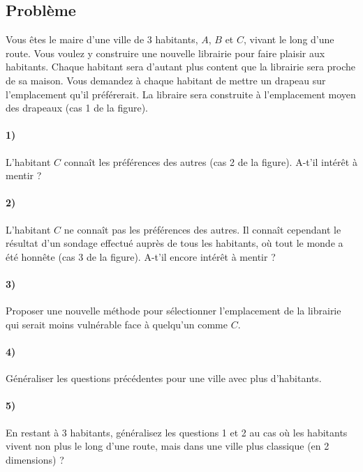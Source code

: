 \documentclass[a4paper,10pt,oneside]{article}
\begin{document}
\subsection{Problème}

Vous êtes le maire d'une ville de 3 habitants, $A$, $B$ et $C$,  vivant le long d'une route.
Vous voulez y construire une nouvelle librairie pour faire plaisir aux habitants.
Chaque habitant sera d'autant plus content que la librairie sera proche de sa maison. 
Vous demandez à chaque habitant de mettre un drapeau sur l'emplacement qu'il préférerait.
La libraire sera construite à l'emplacement moyen des drapeaux (cas 1 de la figure).

\paragraph*{1)} 
L'habitant $C$ connaît les préférences des autres (cas 2 de la figure).
A-t'il intérêt à mentir ?

\paragraph*{2)} 
L'habitant $C$ ne connaît pas les préférences des autres.
Il connaît cependant le résultat d'un sondage effectué auprès de tous les habitants, où tout le monde a été honnête (cas 3 de la figure).
A-t'il encore intérêt à mentir ?

\paragraph*{3)} 
Proposer une nouvelle méthode pour sélectionner l'emplacement de la librairie qui serait moins vulnérable face à quelqu'un comme $C$.

\paragraph*{4)} Généraliser les questions précédentes pour une ville avec plus d'habitants.

\paragraph*{5)} En restant à 3 habitants, généralisez les questions 1 et 2 au cas où les habitants vivent non plus le long d'une route, mais dans une ville plus classique (en 2 dimensions) ? 
\end{document}
